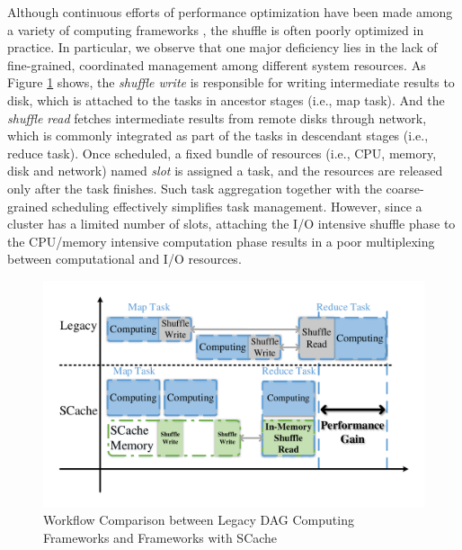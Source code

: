 Although continuous efforts of performance optimization have been made among a variety of computing frameworks \cite{sync, babu, tachyon, pacman, quincy, delay}, 
the shuffle is often poorly optimized in practice.
In particular, we observe that one major deficiency lies in the lack of fine-grained, coordinated management among different system resources.
As Figure \ref{fig:workflow} shows, the \textit{shuffle write} is responsible for writing intermediate results to disk, which is attached to the tasks in ancestor stages (i.e., map task).  
And the \textit{shuffle read} fetches intermediate results from remote disks through network, which is commonly integrated as part of the tasks in descendant stages (i.e., reduce task). 
Once scheduled, a fixed bundle of resources (i.e., CPU, memory, disk and network) named \textit{slot} is assigned a task, and the resources are released only after the task finishes.
\ifrevision
{}
\fi
Such task aggregation together with the coarse-grained scheduling effectively simplifies task management.
However, since a cluster has a limited number of slots, attaching the I/O intensive shuffle phase to the CPU/memory intensive computation phase results in a poor multiplexing between computational and I/O resources.
\begin{figure}
	\centering
	\includegraphics[width=\linewidth]{fig/workflow}
	\caption{Workflow Comparison between Legacy DAG Computing Frameworks and Frameworks with SCache}
	\label{fig:workflow}
	\vspace{-1.4em}
\end{figure}

